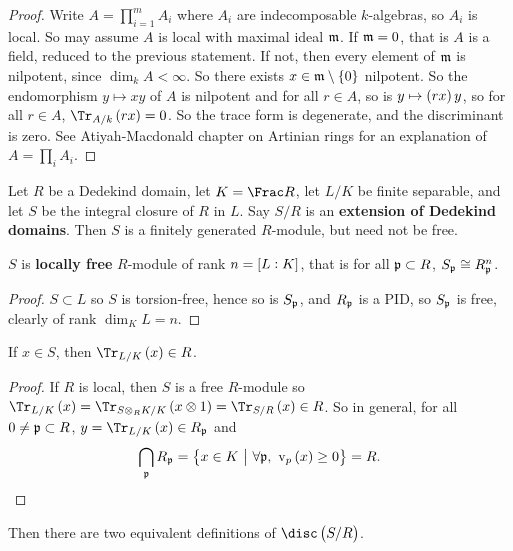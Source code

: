 \begin{proof}
Write $ A = \prod_{i = 1}^m A_i $ where $ A_i $ are indecomposable $ k $-algebras, so $ A_i $ is local. So may assume $ A $ is local with maximal ideal $ \mathfrak{m} $. If $ \mathfrak{m} = 0 $, that is $ A $ is a field, reduced to the previous statement. If not, then every element of $ \mathfrak{m} $ is nilpotent, since $ \dim_k A < \infty $. So there exists $ x \in \mmm \setminus \cbr{0} $ nilpotent. So the endomorphism $ y \mapsto xy $ of $ A $ is nilpotent and for all $ r \in A $, so is $ y \mapsto \br{rx}y $, so for all $ r \in A $, $ \Tr_{A / k}\br{rx} = 0 $. So the trace form is degenerate, and the discriminant is zero. See Atiyah-Macdonald chapter on Artinian rings for an explanation of $ A = \prod_i A_i $.
\end{proof}


Let $ R $ be a Dedekind domain, let $ K = \Frac R $, let $ L / K $ be finite separable, and let $ S $ be the integral closure of $ R $ in $ L $. Say $ S / R $ is an \textbf{extension of Dedekind domains}. Then $ S $ is a finitely generated $ R $-module, but need not be free.

\begin{proposition}
$ S $ is \textbf{locally free} $ R $-module of rank $ n = \sbr{L : K} $, that is for all $ \mathfrak{p} \subset R $, $ S_{\mathfrak{p}} \cong R_{\mathfrak{p}}^n $.
\end{proposition}

\begin{proof}
$ S \subset L $ so $ S $ is torsion-free, hence so is $ S_{\mathfrak{p}} $, and $ R_{\mathfrak{p}} $ is a PID, so $ S_{\mathfrak{p}} $ is free, clearly of rank $ \dim_K L = n $.
\end{proof}

\pagebreak

\begin{lemma}
If $ x \in S $, then $ \Tr_{L / K}\br{x} \in R $.
\end{lemma}

\begin{proof}
If $ R $ is local, then $ S $ is a free $ R $-module so $ \Tr_{L / K}\br{x} = \Tr_{S \otimes_R K / K}\br{x \otimes 1} = \Tr_{S / R}\br{x} \in R $. So in general, for all $ 0 \ne \mathfrak{p} \subset R $, $ y = \Tr_{L / K}\br{x} \in R_\ppp $ and
$$ \bigcap_\ppp R_\ppp = \cbr{x \in K \st \forall \ppp, \ \v_p\br{x} \ge 0} = R. $$
\end{proof}

Then there are two equivalent definitions of $ \disc\br{S / R} $.


